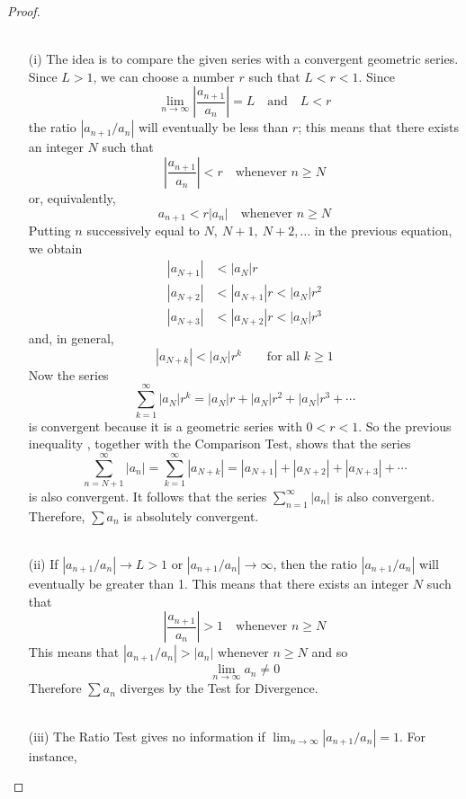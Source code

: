   \begin{proof}\let\qed\relax
    \hphantom{ }\\~\\
    \begin{enumerate}
        \item[(i)] The idea is to compare the given series with a convergent geometric series. Since $L>1$, we can choose a number $r$ such that $L<r<1$. Since
        $$\lim_{n\to\infty} \left|\frac{a_{n+1}}{a_n}\right| = L \quad\text{and}\quad L<r $$
        the ratio $|a_{n+1}/a_n|$ will eventually be less than $r$; this means that there exists an integer $N$ such that
        $$ \left|\frac{a_{n+1}}{a_n}\right| < r \quad\text{whenever  } n \geq N$$
        or, equivalently,
        $$ a_{n+1} < r|a_n| \quad\text{whenever  } n \geq N$$
        Putting $n$ successively equal to $N,\ N+1,\ N+2,\ldots$ in the previous equation, we obtain
        \begin{align*}
          |a_{N+1}| &< |a_{N}|r \\
          |a_{N+2}| &< |a_{N+1}|r < |a_N|r^2 \\
          |a_{N+3}| &< |a_{N+2}|r < |a_N|r^3
        \end{align*}
        and, in general,
        $$  |a_{N+k}| < |a_N|r^k \qquad\text{for all } k \geq 1 $$
        Now the series
        $$ \sum_{k=1}^{\infty} |a_N|r^k = |a_N|r + |a_N|r^2 + |a_N|r^3 + \cdots $$
        is convergent because it is a geometric series with $0 < r < 1$. So the previous inequality , together with the Comparison Test, shows that the series
        $$ \sum_{n=N+1}^{\infty} |a_n| = \sum_{k=1}^{\infty} |a_{N+k}| = |a_{N+1}| + |a_{N+2}| + |a_{N+3}| + \cdots $$
        is also convergent. It follows that the series $\sum_{n=1}^{\infty} |a_n|$ is also convergent. Therefore, $\sum a_n$ is absolutely convergent.
        \\~\\
        \item[(ii)] If $|a_{n+1}/a_n| \to L > 1$ or $|a_{n+1}/a_n| \to \infty$, then the ratio $|a_{n+1}/a_n|$ will eventually be greater than 1. This means that there exists an integer $N$ such that
        $$ \left|\frac{a_{n+1}}{a_n}\right| > 1 \quad\text{whenever  } n \geq N $$
        This means that $|a_{n+1}/a_n| > |a_n|$ whenever $n \geq N$ and so $$\lim_{n\to\infty}a_n \neq 0$$
        Therefore $\sum a_n$ diverges by the Test for Divergence.
        \\~\\
        \item[(iii)] The Ratio Test gives no information if $\lim_{n\to\infty} |a_{n+1}/a_n| = 1$. For instance,

\end{enumerate}
\end{proof}

